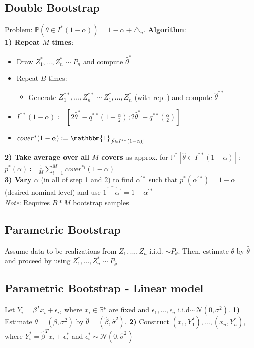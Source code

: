 \subsection*{Double Bootstrap}
Problem: $\mathbb{P}(\theta \in I^*(1-\alpha)) = 1-\alpha+\triangle_n$. \textbf{Algorithm}:\\
\textbf{1) Repeat $M$ times}:
\begin{itemize}
    \item Draw $Z_1^*,...,Z_n^* \sim P_n$ and compute $\hat{\theta}^*$
    \item Repeat $B$ times:
    \begin{itemize}
        \item Generate $Z_1^{**},...,Z_n^{**} \sim Z_1^*,...,Z_n^*$ (with repl.) and compute $\hat{\theta}^{**}$
    \end{itemize}
    \item $I^{**}(1-\alpha) \coloneqq [2\hat{\theta}^* - q^{**}(1-\frac{\alpha}{2}); 2\hat{\theta}^* - q^{**}(\frac{\alpha}{2})]$
    
    \item ${cover}^*(1-\alpha) \coloneqq \mathbbm{1}_{[\hat{\theta} \in I^{**}(1-\alpha)]}$
\end{itemize}
\textbf{2) Take average over all $M$ covers} as approx. for $\mathbb{P}^*[\hat{\theta} \in I^{**}(1-\alpha)]$: \\ 
$p^*(\alpha) \coloneqq \frac{1}{M}\sum_{i=1}^M {cover}^{*i}(1-\alpha)$ \\
\textbf{3) Vary $\alpha$} (in all of step 1 and 2) to find $\alpha^{\prime*}$ such that $p^*(\alpha^{\prime*}) = 1-\alpha$ (desired nominal level) and use $\widehat{1- \alpha^{\prime}} = 1 - \alpha^{\prime*}$ \\
\emph{Note}: Requires $B*M$ bootstrap samples

\subsection*{Parametric Bootstrap} 
Assume data to be realizations from $Z_1,...,Z_n$ i.i.d. $\sim P_{\theta}$. Then, estimate $\theta$ by $\hat{\theta}$ and proceed by using $Z_1^{*},...,Z_n^{*} \sim P_{\hat{\theta}}$

\subsection*{Parametric Bootstrap - Linear model}
Let $Y_i = \beta^T x_i + \epsilon_i$, where $x_i \in \mathbb{R}^p$ are fixed and $\epsilon_1,..., \epsilon_n$ i.i.d$\sim \mathcal{N}(0, \sigma^2)$. \textbf{1)} Estimate $\theta = (\beta, \sigma^2)$ by $\hat{\theta} = (\hat{\beta}, \hat{\sigma}^2)$. \textbf{2)} Construct $(x_1, Y_1^*),...,(x_n, Y_n^*)$, where $Y_i^* = \hat{\beta}^T x_i + \epsilon_i^*$ and $\epsilon_i^* \sim \mathcal{N}(0, \hat{\sigma}^2)$

